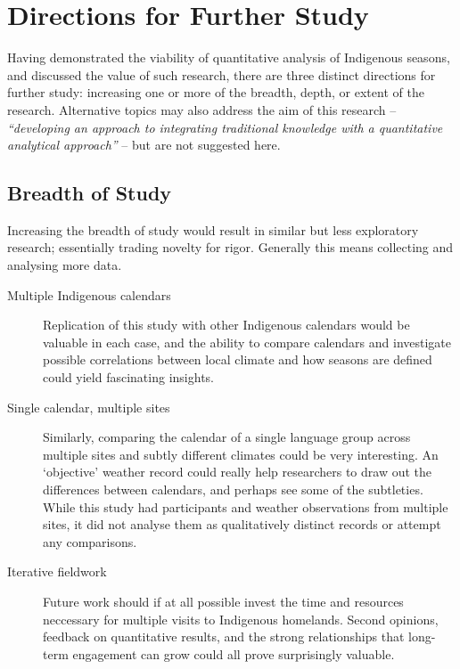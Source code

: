 \section{Directions for Further Study}
\label{sec:further-study}

Having demonstrated the viability of quantitative analysis of Indigenous
seasons, and discussed the value of such research, there are three distinct
directions for further study:  increasing one or more of the breadth, depth,
or extent of the research.  Alternative topics may also address the aim
of this research -- \textit{``developing an approach to integrating traditional
knowledge with a quantitative analytical approach''} -- but are not suggested
here.

\subsection{Breadth of Study}
Increasing the breadth of study would result in similar but less exploratory
research; essentially trading novelty for rigor.  Generally this means
collecting and analysing more data.

\begin{description}
\item[Multiple Indigenous calendars]
    Replication of this study with other Indigenous calendars would be
    valuable in each case, and the ability to compare calendars and investigate
    possible correlations between local climate and how seasons are defined
    could yield fascinating insights.

\item[Single calendar, multiple sites]
    Similarly, comparing the calendar of a single language group across
    multiple sites and subtly different climates could be very interesting.
    An `objective' weather record could really help researchers to draw out
    the differences between calendars, and perhaps see some of the subtleties.
    While this study had participants and weather observations from multiple
    sites, it did not analyse them as qualitatively distinct records or
    attempt any comparisons.

\item[Iterative fieldwork]
    Future work should if at all possible invest the time and resources
    neccessary for multiple visits to Indigenous homelands.  Second opinions,
    feedback on quantitative results, and the strong relationships that
    long-term engagement can grow could all prove surprisingly valuable.
\end{description}

